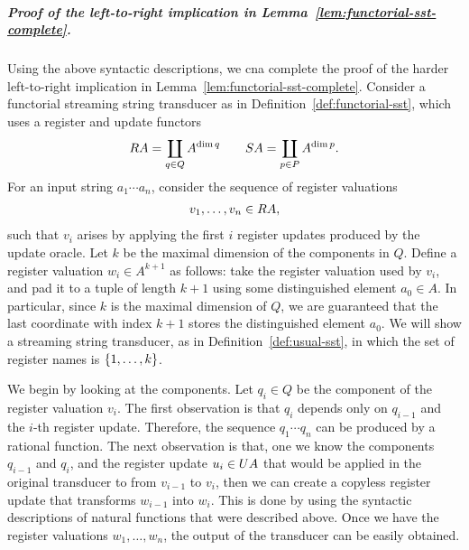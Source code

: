 \subparagraph*{Proof of the left-to-right implication in Lemma~\ref{lem:functorial-sst-complete}.} Using the above syntactic descriptions, we cna complete the proof of the harder left-to-right implication in Lemma~\ref{lem:functorial-sst-complete}. Consider a functorial streaming string transducer as in Definition~\ref{def:functorial-sst}, which uses a register and update functors 
\begin{align*} 
\functorr A = \coprod_{q \in Q} A^{\dim q} \qquad 
\functors A = \coprod_{p \in P} A^{\dim p}.
\end{align*}
For an input string $a_1 \cdots a_n$, consider the sequence of register valuations 
\begin{align*}
v_1,\ldots,v_n \in \functorr A,
\end{align*}
such that $v_i$ arises by applying the first $i$ register updates produced by the update oracle. Let $k$ be the maximal dimension of the components in $Q$. Define a register valuation $w_i \in A^{k+1}$ as follows: take the register valuation used by $v_i$, and pad it to a tuple of length  $k+1$ using some distinguished element $a_0 \in A$. In particular, since $k$ is the maximal dimension of $Q$, we are guaranteed that the last coordinate with index $k+1$ stores the distinguished element $a_0$. We will show a streaming string transducer, as in Definition~\ref{def:usual-sst}, in which the set of register names is $\{1,\ldots,k\}$. 

We begin by looking at the components.  Let $q_i \in Q$ be the component of the register valuation $v_i$. The first observation is that $q_i$ depends only on $q_{i-1}$ and the $i$-th register update. Therefore, the sequence $q_1 \cdots q_n$ can be produced by a rational function. The next observation is that, one we know the components $q_{i-1}$ and $q_{i}$, and the register update $u_i \in \functoru A$ that would be applied in the original transducer to from $v_{i-1}$ to $v_i$, then we can create a copyless register update that transforms $w_{i-1}$ into $w_i$. This is done by using the syntactic descriptions of natural functions that were described above. Once we have the register valuations $w_1,\ldots,w_n$, the output of the transducer can be easily obtained.

